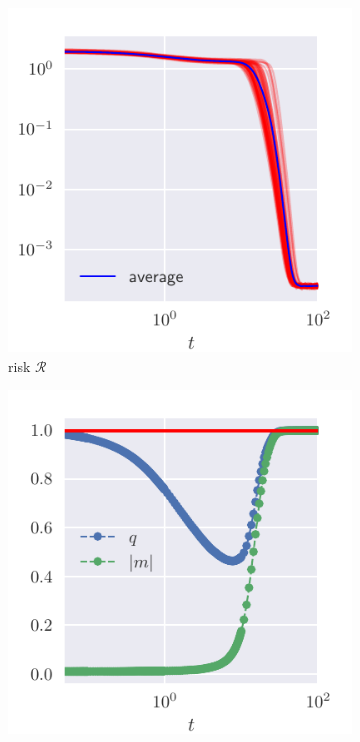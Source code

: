 \begin{figure}
  \centering
  \begin{subfigure}{0.495\textwidth}
    \includegraphics[width=1.\textwidth]{figures/unconstraned-phase-retrieval-risk.pdf}
    \caption{risk \(\mathcal{R}\)}
  \end{subfigure}
  \begin{subfigure}{0.495\textwidth}
    \includegraphics[width=1.\textwidth]{figures/unconstraned-phase-retrieval-qm.pdf}

\end{subfigure}
\end{figure}
